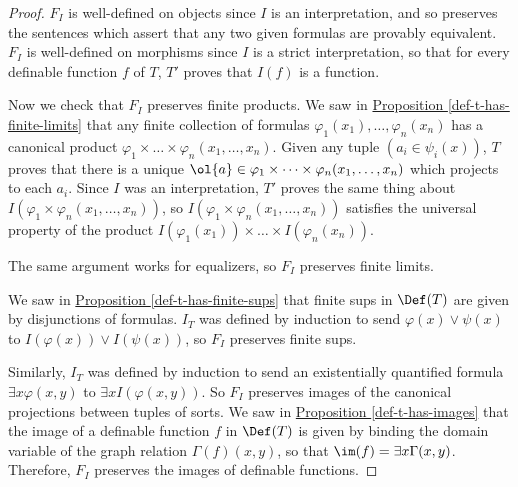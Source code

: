 \documentclass[11pt]{article}
\begin{document}
  \begin{proof}
    $F_I$ is well-defined on objects since $I$ is an interpretation, and so preserves the sentences which assert that any two given formulas are provably equivalent. $F_I$ is well-defined on morphisms since $I$ is a strict interpretation, so that for every definable function $f$ of $T$, $T'$ proves that $I(f)$ is a function.

    Now we check that $F_I$ preserves finite products. We saw in \hyperref[def-t-has-finite-limits]{Proposition \ref*{def-t-has-finite-limits}} that any finite collection of formulas $\varphi_1(x_1), \dots, \varphi_n(x_n)$ has a canonical product $\varphi_1 \times \dots \times \varphi_n(x_1, \dots, x_n)$. Given any tuple $(a_i \in \psi_i(x))$, $T$ proves that there is a unique $\ol{a} \in \varphi_1 \times \dots \times \varphi_n(x_1, \dots, x_n)$ which projects to each $a_i$. Since $I$ was an interpretation, $T'$ proves the same thing about $I(\varphi_1 \times \varphi_n(x_1, \dots, x_n))$, so $I(\varphi_1 \times \varphi_n(x_1, \dots, x_n))$ satisfies the universal property of the product $I(\varphi_1(x_1)) \times \dots \times I(\varphi_n(x_n))$.

    The same argument works for equalizers, so $F_I$ preserves finite limits.

    We saw in \hyperref[def-t-has-finite-sups]{Proposition \ref*{def-t-has-finite-sups}} that finite sups in $\Def(T)$ are given by disjunctions of formulas. $I_T$ was defined by induction to send $\varphi(x) \lor \psi(x)$ to $I(\varphi(x)) \lor I(\psi(x))$, so $F_I$ preserves finite sups.

    Similarly, $I_T$ was defined by induction to send an existentially quantified formula $\exists x \varphi(x,y)$ to $\exists x I(\varphi(x,y))$. So $F_I$ preserves images of the canonical projections between tuples of sorts. We saw in \hyperref[def-t-has-images]{Proposition \ref*{def-t-has-images}} that the image of a definable function $f$ in $\Def(T)$ is given by binding the domain variable of the graph relation $\Gamma(f)(x,y)$, so that $\im(f) = \exists x \Gamma(x,y)$. Therefore, $F_I$ preserves the images of definable functions.
  \end{proof}
\end{document}
